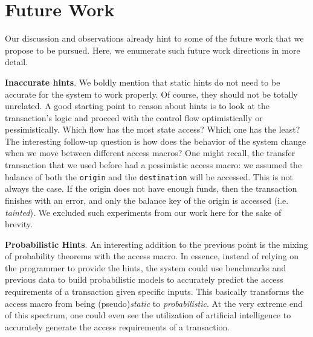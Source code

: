 \section{Future Work} \label{chap_conc:sec:future_work}

Our discussion and observations already hint to some of the future work that we propose to be
pursued. Here, we enumerate such future work directions in more detail.

\textbf{Inaccurate hints}. We boldly mention that static hints do not need to be accurate for the
system to work properly. Of course, they should not be totally unrelated. A good starting point to
reason about hints is to look at the transaction's logic and proceed with the control flow
optimistically or pessimistically. Which flow has the most state access? Which one has the least?
The interesting follow-up question is how does the behavior of the system change when we move
between different access macros? One might recall, the transfer transaction that we used before had
a pessimistic access macro: we assumed the balance of both the \texttt{origin} and the
\texttt{destination} will be accessed. This is not always the case. If the origin does not have
enough funds, then the transaction finishes with an error, and only the balance key of the origin is
accessed (i.e. \textit{tainted}). We excluded such experiments from our work here for the sake of
brevity.

\textbf{Probabilistic Hints}. An interesting addition to the previous point is the mixing of
probability theorems with the access macro. In essence, instead of relying on the programmer to
provide the hints, the system could use benchmarks and previous data to build probabilistic models
to accurately predict the access requirements of a transaction given specific inputs. This basically
transforms the access macro from being (pseudo)\textit{static} to \textit{probabilistic}. At the
very extreme end of this spectrum, one could even see the utilization of artificial intelligence to
accurately generate the access requirements of a transaction.

